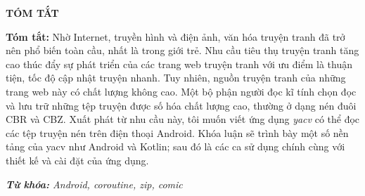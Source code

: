 \documentclass[../../../thesis]{subfiles}
\begin{document}
\begin{center}
    \textbf{\large
        TÓM TẮT
    }
\end{center}

\textbf{Tóm tắt:} Nhờ Internet, truyền hình và điện ảnh, văn hóa truyện tranh đã
trở nên phổ biến toàn cầu, nhất là trong giới trẻ. Nhu cầu tiêu thụ truyện tranh
tăng cao thúc đẩy sự phát triển của các trang web truyện tranh với ưu điểm là
thuận tiện, tốc độ cập nhật truyện nhanh. Tuy nhiên, nguồn truyện tranh của
những trang web này có chất lượng không cao. Một bộ phận người đọc kĩ tính chọn
đọc và lưu trữ những tệp truyện được số hóa chất lượng cao, thường ở dạng nén
đuôi CBR và CBZ. Xuất phát từ nhu cầu này, tôi muốn viết ứng dụng \emph{yacv} có
thể đọc các tệp truyện nén trên điện thoại Android. Khóa luận sẽ trình bày một
số nền tảng của yacv như Android và Kotlin; sau đó là các ca sử dụng chính cùng
với thiết kế và cài đặt của ứng dụng.

\textit{
    \textbf{Từ khóa:} Android, coroutine, zip, comic
}

\thispagestyle{empty}

\clearpage
\end{document}
